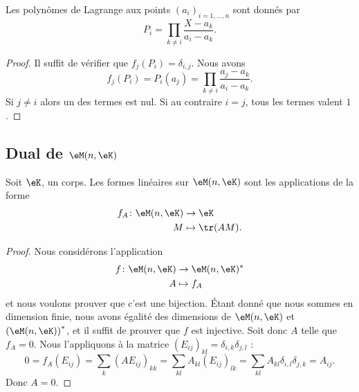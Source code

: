 \begin{proposition}
	Les polynômes de Lagrange aux points \( (a_i)_{i=1,\ldots, n}\) sont donnés par
	\begin{equation}
		P_i=\prod_{k\neq i}\frac{ X-a_k }{ a_i-a_k }.
	\end{equation}
\end{proposition}

\begin{proof}
	Il suffit de vérifier que \( f_j(P_i)=\delta_{i,j}\). Nous avons
	\begin{equation}
		f_j(P_i)=P_i(a_j)=\prod_{k\neq i}\frac{ a_j-a_k }{ a_i-a_k }.
	\end{equation}
	Si \( j\neq i\) alors un des termes est nul. Si au contraire \( i=j\), tous les termes valent \( 1\).
\end{proof}

\subsection{Dual de \texorpdfstring{$ \eM(n,\eK)$}{M(n,K)}}

\begin{proposition}     \label{PropHOjJpCa}
	Soit \( \eK\), un corps. Les formes linéaires sur \( \eM(n,\eK)\) sont les applications de la forme
	\begin{equation}
		\begin{aligned}
			f_A\colon \eM(n,\eK) & \to \eK          \\
			M                    & \mapsto \tr(AM).
		\end{aligned}
	\end{equation}
\end{proposition}


\begin{proof}
	Nous considérons l'application
	\begin{equation}
		\begin{aligned}
			f\colon \eM(n,\eK) & \to \eM(n,\eK)^* \\
			A                  & \mapsto f_A
		\end{aligned}
	\end{equation}
	et nous voulons prouver que c'est une bijection. Étant donné que nous sommes en dimension finie, nous avons égalité des dimensions de \( \eM(n,\eK)\) et \( \left(\eM(n,\eK)\right)^*\), et il suffit de prouver que \( f\) est injective. Soit donc \( A\) telle que \( f_A=0\). Nous l'appliquons à la matrice \( (E_{ij})_{kl}=\delta_{i,k}\delta_{j,l}\) :
	\begin{equation}
		0 = f_A(E_{ij})
		= \sum_{k}(AE_{ij})_{kk}
		= \sum_{kl}A_{kl}(E_{ij})_{lk}
		= \sum_{kl}A_{kl}\delta_{i,l}\delta_{j,k}
		= A_{ij}.
	\end{equation}
	Donc \( A=0\).
\end{proof}

